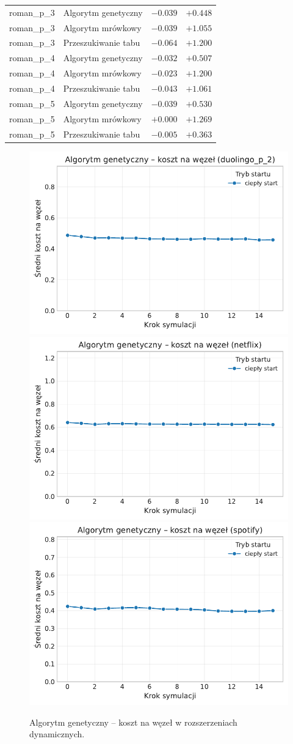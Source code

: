 \begin{table}[H]
\begin{tabular}{llrr}
    roman\_p\_3           & Algorytm genetyczny & $-0.039$                      & $+0.448$                   \\
    roman\_p\_3           & Algorytm mrówkowy   & $-0.039$                      & $+1.055$                   \\
    roman\_p\_3           & Przeszukiwanie tabu & $-0.064$                      & $+1.200$                   \\
    roman\_p\_4           & Algorytm genetyczny & $-0.032$                      & $+0.507$                   \\
    roman\_p\_4           & Algorytm mrówkowy   & $-0.023$                      & $+1.200$                   \\
    roman\_p\_4           & Przeszukiwanie tabu & $-0.043$                      & $+1.061$                   \\
    roman\_p\_5           & Algorytm genetyczny & $-0.039$                      & $+0.530$                   \\
    roman\_p\_5           & Algorytm mrówkowy   & $+0.000$                      & $+1.269$                   \\
    roman\_p\_5           & Przeszukiwanie tabu & $-0.005$                      & $+0.363$                   \\
  \end{tabular}
\end{table}



\begin{figure}[H]
  \centering
  \includegraphics[width=0.32\linewidth]{assets/figures/extensions/dynamic/algorytm_genetyczny_cost_per_node_steps_duolingo_p_2.pdf}
  \includegraphics[width=0.32\linewidth]{assets/figures/extensions/dynamic/algorytm_genetyczny_cost_per_node_steps_netflix.pdf}
  \includegraphics[width=0.32\linewidth]{assets/figures/extensions/dynamic/algorytm_genetyczny_cost_per_node_steps_spotify.pdf}
  \caption{Algorytm genetyczny -- koszt na węzeł w rozszerzeniach dynamicznych.}
  \label{fig:dyn-ext-genetic-cost}
\end{figure}

